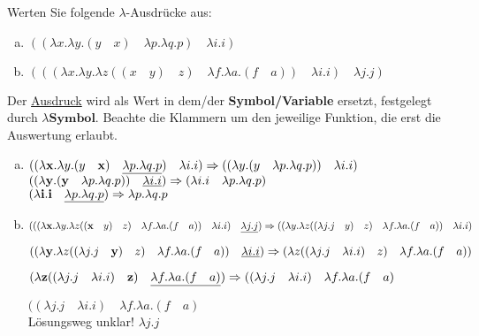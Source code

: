 \begin{card}
	Werten Sie folgende $\lambda$-Ausdrücke aus:
	\begin{enumerate}[a)]
	\item $((\lambda x.\lambda y.(y \quad x) \quad \lambda p.\lambda q.p) \quad \lambda i.i)$
	\item $(((\lambda x.\lambda y.\lambda z((x \quad y) \quad z) \quad \lambda f.\lambda a.(f \quad a)) \quad \lambda i.i) \quad\lambda j.j)$
	\end{enumerate}
	\hr
	Der \underline{Ausdruck} wird als Wert in dem/der \textbf{Symbol/Variable} ersetzt, festgelegt durch $\lambda\mathbf{Symbol}$. Beachte die Klammern um den jeweilige Funktion, die erst die Auswertung erlaubt.
	\begin{enumerate}[a)]
	\item
	$((\lambda \mathbf{x}.\lambda y.(y \quad \mathbf{x}) \quad \uline{\lambda p.\lambda q.p}) \quad \lambda i.i) 
	\Rightarrow 
	((\lambda y.(y \quad \lambda p.\lambda q.p)) \quad \lambda i.i)$\\
	
	$((\lambda \mathbf{y}.(\mathbf{y} \quad \lambda p.\lambda q.p)) \quad \uline{\lambda i.i})
	\Rightarrow
	(\lambda i.i \quad \lambda p.\lambda q.p)$\\
	
	$(\lambda \mathbf{i}.\mathbf{i} \quad \uline{\lambda p.\lambda q.p})
	\Rightarrow
	\lambda p.\lambda q.p$
	\item 
	$(((\lambda \mathbf{x}.\lambda y.\lambda z((\mathbf{x} \quad y) \quad z) \quad \lambda f.\lambda a.(f \quad a)) \quad \lambda i.i) \quad \uline{\lambda j.j}) \Rightarrow
	((\lambda y.\lambda z((\lambda j.j \quad y) \quad z) \quad \lambda f.\lambda a.(f \quad a)) \quad \lambda i.i)$
	
	$((\lambda \mathbf{y}.\lambda z((\lambda j.j \quad \mathbf{y}) \quad z) \quad \lambda f.\lambda a.(f \quad a)) \quad \uline{\lambda i.i}) \Rightarrow 
	(\lambda z((\lambda j.j \quad \lambda i.i) \quad z) \quad \lambda f.\lambda a.(f \quad a))$
	
	$(\lambda \mathbf{z}((\lambda j.j \quad \lambda i.i) \quad \mathbf{z}) \quad \uline{\lambda f.\lambda a.(f \quad a)}) \Rightarrow 
	((\lambda j.j \quad \lambda i.i) \quad \lambda f.\lambda a.(f \quad a)$
	
	$((\lambda j.j \quad \lambda i.i) \quad \lambda f.\lambda a.(f \quad a)$
	\\Lösungsweg unklar! $\lambda j.j$
	\end{enumerate}	
\end{card}


